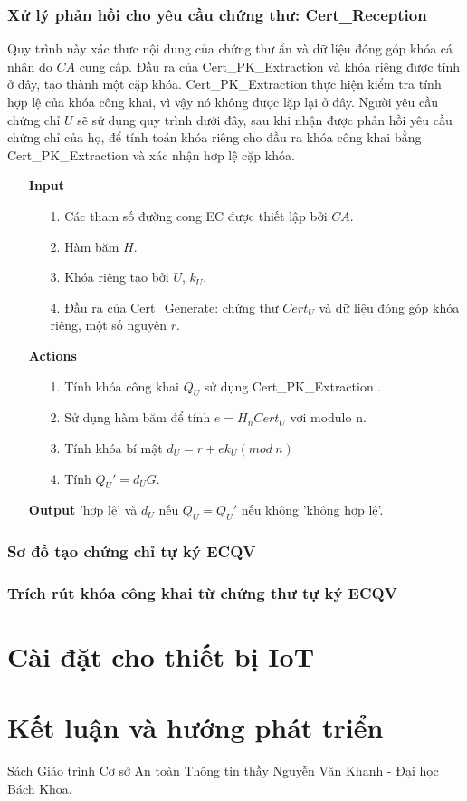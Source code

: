 \documentclass[a4paper,12pt]{report}
\begin{document}
\subsection{Xử lý phản hồi cho yêu cầu chứng thư: Cert\_Reception}
Quy trình này xác thực nội dung của chứng thư ẩn và dữ liệu đóng góp khóa cá nhân do $CA$ cung cấp. Đầu ra của Cert\_PK\_Extraction và khóa riêng được tính ở đây, tạo thành một cặp khóa. Cert\_PK\_Extraction thực hiện kiểm tra tính hợp lệ của khóa công khai, vì vậy nó không được lặp lại ở đây. Người yêu cầu chứng chỉ $U$ sẽ sử dụng quy trình dưới đây, sau khi nhận được phản hồi yêu cầu chứng chỉ của họ, để tính toán khóa riêng cho đầu ra khóa công khai bằng Cert\_PK\_Extraction và xác nhận hợp lệ cặp khóa.
\begin{itemize}
\item[] \textbf{Input}
\begin{itemize}
\item[1. ] Các tham số đường cong EC được thiết lập bởi $CA$.
\item[2. ] Hàm băm $H$.
\item[3. ] Khóa riêng tạo bởi $U$, $k_U$.
\item[4. ] Đầu ra của Cert\_Generate: chứng thư $Cert_U$ và dữ liệu đóng góp khóa riêng, một số nguyên $r$.
\end{itemize}
\item[] \textbf{Actions}
\begin{itemize}
\item[1. ] Tính khóa công khai $Q_U$ sử dụng Cert\_PK\_Extraction .
\item[2. ] Sử dụng hàm băm để tính $e = H_n{Cert_U}$ vơi modulo n.
\item[3. ] Tính khóa bí mật $d_U = r + ek_U (mod \ n)$
\item[4. ] Tính $Q_U' = d_UG$.
\end{itemize}
\item[] \textbf{Output} 'hợp lệ' và $d_U$ nếu $Q_U = Q_U'$ nếu không 'không hợp lệ'.
\end{itemize}
\subsection{Sơ đồ tạo chứng chỉ tự ký ECQV}
\subsection{Trích rút khóa công khai từ chứng thư tự ký ECQV}
\chapter{Cài đặt cho thiết bị IoT}
\chapter*{Kết luận và hướng phát triển}
\begin{thebibliography}{9}
 Sách Giáo trình Cơ sở An toàn Thông tin thầy Nguyễn Văn Khanh - Đại học Bách Khoa.
\end{thebibliography}
\end{document}
